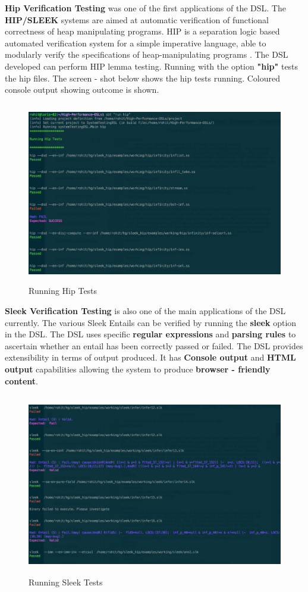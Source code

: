 \documentclass[12pt]{article}
\begin{document}
\noindent
\textbf{Hip Verification Testing} was one of the first applications of the DSL. The \textbf{HIP/SLEEK} systems are aimed at automatic verification of functional correctness of heap manipulating programs. HIP is a separation logic based automated verification system for a simple imperative language, able to modularly verify the specifications of heap-manipulating programs \cite{hipsleek}. The DSL developed can perform HIP lemma testing. Running with the option \textbf{"hip"} tests the hip files. The screen - shot below shows the hip tests running. Coloured console output showing outcome is shown.
\bigskip

\begin{figure}[H]
  \centering
    \includegraphics[height=300px]{figures/hip_testing.png}
  \caption{Running Hip Tests}
\end{figure}

\noindent
\textbf{Sleek Verification Testing} is also one of the main applications of the DSL currently. The various Sleek Entails can be verified by running the \textbf{sleek} option in the DSL. The DSL uses specific \textbf{regular expressions} and \textbf{parsing rules} to ascertain whether an entail has been correctly passed or failed. The DSL provides extensibility in terms of output produced. It has \textbf{Console output} and \textbf{HTML output} capabilities allowing the system to produce \textbf{browser - friendly content}.
\bigskip

\begin{figure}[H]
  \centering
    \includegraphics[height=300px]{figures/sleek_testing.png}
  \caption{Running Sleek Tests}
\end{figure}
\end{document}
